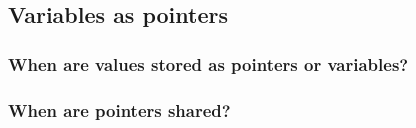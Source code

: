 
\subsection{Variables as pointers}

\subsubsection{When are values stored as pointers or variables?}

\subsubsection{When are pointers shared?}


